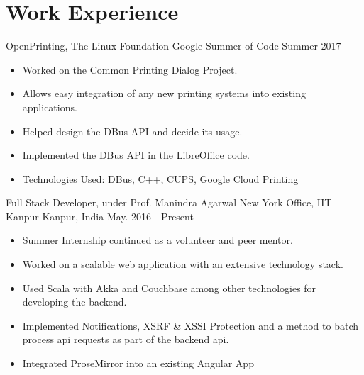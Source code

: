 \section*{Work Experience}

\cventry
{OpenPrinting, The Linux Foundation}
{Google Summer of Code}
{}
{Summer 2017}
{
  \begin{itemize}
  \item Worked on the Common Printing Dialog Project.
  \item Allows easy integration of any new printing systems into existing applications.
  \item Helped design the DBus API and decide its usage.
  \item Implemented the DBus API in the LibreOffice code.
  \item Technologies Used: DBus, C++, CUPS, Google Cloud Printing
  \end{itemize}
}

\cventry
{Full Stack Developer, under Prof. Manindra Agarwal}
{New York Office, IIT Kanpur}
{Kanpur, India}
{May. 2016 - Present}
{
  \begin{itemize}
  \item Summer Internship continued as a volunteer and peer mentor.
  \item Worked on a scalable web application with an extensive technology stack.
  \item Used Scala with Akka and Couchbase among other technologies for
    developing the backend.
  \item	Implemented Notifications, XSRF \& XSSI Protection and a method
    to batch process api requests as part of the backend api.
  \item Integrated ProseMirror into an existing Angular App
  \end{itemize}
}
